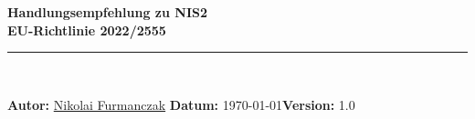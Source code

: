 \documentclass[11pt]{article}
\begin{document}
\begin{titlepage}
    \thispagestyle{empty}
    \begin{center}

        {\Huge\bfseries
        Handlungsempfehlung zu NIS2 \\EU-Richtlinie 2022/2555 \\[1.5cm]}

        \vspace{8cm}


        \noindent\rule{\textwidth}{1.2pt} \\[1cm]

        \begin{tcolorbox}[colframe=white, colback=gray!10, boxrule=0.8pt, width=0.9\textwidth, sharp corners]
            \vspace{0.5cm}
            \textbf{Autor:} \href{mailto:nikolai@furmanczak.de}{Nikolai Furmanczak} \hfill \textbf{Datum:} \today \hfill  \textbf{Version:} 1.0
            \vspace{0.5cm}
        \end{tcolorbox}

        \vfill


    \end{center}
\end{titlepage}

\printglossaries

\tableofcontents
\newpage
{}












\clearpage
\printbibliography[heading=bibintoc]
\end{document}
